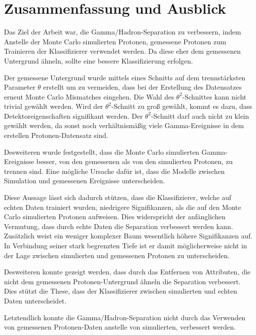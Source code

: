 \chapter{Zusammenfassung und Ausblick}
Das Ziel der Arbeit war, die Gamma/Hadron-Separation zu verbessern, indem Anstelle der Monte Carlo simulierten Protonen, gemessene Protonen zum Trainieren der Klassifizierer verwendet werden. 
Da diese eher dem gemessenen Untergrund ähneln, sollte eine bessere Klassifizierung erfolgen.

Der gemessene Untergrund wurde mittels eines Schnitts auf dem trennstärksten Parameter $\theta$ erstellt um zu vermeiden, dass bei der Erstellung des Datensatzes erneut Monte Carlo Mismatches eingehen.
Die Wahl des $\theta^{2}$-Schnittes kann nicht trivial gewählt werden. 
Wird der $\theta^{2}$-Schnitt zu groß gewählt, kommt es dazu, dass Detektoreigenschaften signifikant werden. 
Der $\theta^{2}$-Schnitt darf auch nicht zu klein gewählt werden, da sonst noch verhältnismäßig viele Gamma-Ereignisse in dem erstellen Protonen-Datensatz sind.

Desweiteren wurde festgestellt, dass die Monte Carlo simulierten Gamma-Ereignisse besser, von den gemessenen als von den simulierten Protonen, zu trennen sind. 
Eine mögliche Ursache dafür ist, dass die Modelle zwischen Simulation und gemessenen Ereignisse unterscheiden.

Diese Aussage lässt sich dadurch stützen, dass die Klassifizierer, welche auf echten Daten trainiert wurden, niedrigere Signifikanzen, als die auf den Monte Carlo simulierten Protonen aufweisen. 
Dies widerspricht der anfänglichen Vermutung, dass durch echte Daten die Separation verbessert werden kann. 
Zusätzlich weist ein weniger komplexer Baum wesentlich höhere Signifikanzen auf. 
In Verbindung seiner stark begrenzten Tiefe ist er damit möglicherweise nicht in der Lage zwischen simulierten und gemessenen Protonen zu unterscheiden. 

Desweiteren konnte gezeigt werden, dass durch das Entfernen von Attributen, die nicht dem gemessenen Protonen-Untergrund ähneln die Separation verbessert. 
Dies stützt die These, dass der Klassifizierer zwischen simulierten und echten Daten unterscheidet.

Letztendlich konnte die Gamma/Hadron-Separation nicht durch das Verwenden von gemessenen Protonen-Daten anstelle von simulierten, verbessert werden. 

